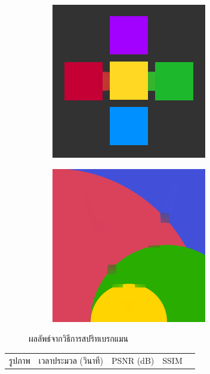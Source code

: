 \documentclass[hidelinks, a4paper,12pt]{article}
\numberwithin{equation}{section}							%
\numberwithin{equation}{section}
\begin{document}
{\begin{figure}[H]
\begin{subfigure}{0.4\linewidth}
		\includegraphics[width=0.8\linewidth]{images/result_ex1/splitbergman04.png}			
	\end{subfigure}
	\begin{subfigure}{0.4\linewidth}
		\centering
		\includegraphics[width=0.8\linewidth]{images/result_ex1/splitbergman05.png}			
	\end{subfigure}
	\caption{ผลลัพธ์จากวิธีการสปริทเบรกแมน}
\end{figure}
\begin{table}[H]
	\centering
	\begin{tabular}[ht]{|c|c|c|c|c|}
		\hline
		รูปภาพ &เวลาประมวล  (วินาที) & PSNR (dB) & SSIM \\

\end{tabular}
\end{table}}
\end{document}
